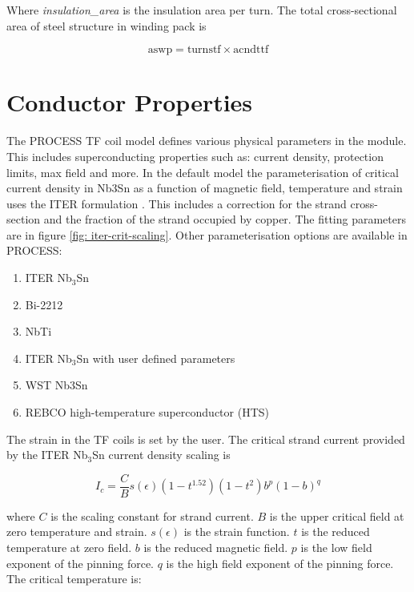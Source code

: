 \documentclass[hidelinks]{article}
\numberwithin{equation}{section}
\begin{document}
    \noi Where \emph{insulation\_area} is the insulation area per turn. The total cross-sectional 
    area of steel structure in winding pack is

    \begin{equation}
        \text{aswp} = \text{turnstf} \times \text{acndttf}
    \end{equation}
    
    \section{Conductor Properties}

    The PROCESS TF coil model defines various physical parameters in the module. This 
    includes superconducting properties such as: current density, protection limits, 
    max field and more. In the default model the parameterisation of critical current 
    density in Nb3Sn as a function of magnetic field, temperature and strain uses the 
    ITER formulation \cite{Bottura2009}. This includes a correction for the strand 
    cross-section and the fraction of the strand occupied by copper. The fitting 
    parameters are in figure \ref{fig: iter-crit-scaling}. Other parameterisation 
    options are available in PROCESS:
    
    \begin{enumerate}
        \item ITER Nb$_3$Sn
        \item Bi-2212
        \item NbTi
        \item ITER Nb$_3$Sn with user defined parameters
        \item WST Nb3Sn
        \item REBCO high-temperature superconductor (HTS)
    \end{enumerate}
    
    \noi The strain in the TF coils is set by the user. The critical strand
    current provided by the ITER Nb$_3$Sn current density scaling is

    \begin{equation}\label{eq: strand-crit-current}
        I_c = \frac{C}{B}s(\epsilon)(1-t^{1.52})(1-t^2)b^p(1-b)^q
    \end{equation}

    \noi where $C$ is the scaling constant for strand current. $B$ is the upper 
    critical field at zero temperature and strain. $s(\epsilon)$ is the strain 
    function. $t$ is the reduced temperature at zero field. $b$ is the reduced 
    magnetic field. $p$ is the low field exponent of the pinning force. $q$ is 
    the high field exponent of the pinning force. The critical temperature is:
\end{document}
